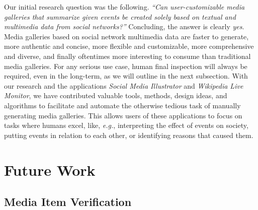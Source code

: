 Our initial research question was the following.
\textit{``Can user-customizable media galleries
that summarize given events be
created solely based on textual and multimedia data
from social networks?''}
Concluding, the answer is clearly \emph{yes}.
Media galleries based on social network multimedia data 
are faster to generate, more authentic and concise,
more flexible and customizable, more comprehensive and diverse, and finally oftentimes more interesting to consume than
traditional media galleries.
For any serious use case, human final inspection will
always be required, even in the long-term,
as we will outline in the next subsection.
With our research and the applications
\emph{Social Media Illustrator} and \emph{Wikipedia Live Monitor},
we have contributed valuable tools,
methods, design ideas, and algorithms
to facilitate and automate the otherwise tedious task
of manually generating media galleries.
This allows users of these applications
to focus on tasks where humans excel,
like, \emph{e.g.}, interpreting the effect of events on society,
putting events in relation to each other,
or identifying reasons that caused them.

\section{Future Work}

\subsection{Media Item Verification}

